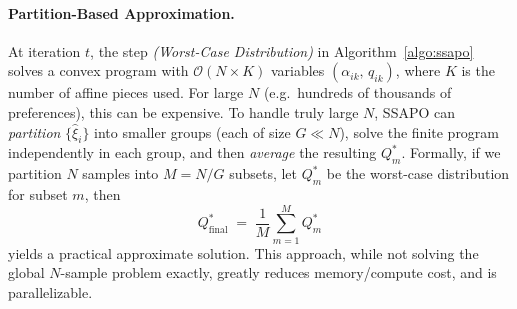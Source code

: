 \paragraph{Partition-Based Approximation.}
At iteration $t$, the step \emph{(Worst-Case Distribution)} in 
Algorithm~\ref{algo:ssapo} solves a convex program with $\mathcal{O}(N \times K)$ 
variables $(\alpha_{ik},\,q_{ik})$, where $K$ is the number of affine pieces used.  
For large $N$ (e.g.\ hundreds of thousands of preferences), 
this can be expensive.
To handle truly large $N$, SSAPO can \emph{partition} $\{\hat{\xi}_i\}$ 
into smaller groups (each of size $G \ll N$), solve the finite program 
independently in each group, and then \emph{average} the resulting $Q^*_m$.  
Formally, if we partition $N$ samples into $M = N/G$ subsets, let 
$Q^*_m$ be the worst-case distribution for subset $m$, then 
\begin{equation}
\label{eq:partition_average}
Q_{\mathrm{final}}^*
\;=\;
\frac{1}{M}
\sum_{m=1}^M
Q^*_m
\end{equation}
yields a practical approximate solution.  This approach, while not solving the 
global $N$-sample problem exactly, greatly reduces memory/compute cost, and is parallelizable.

